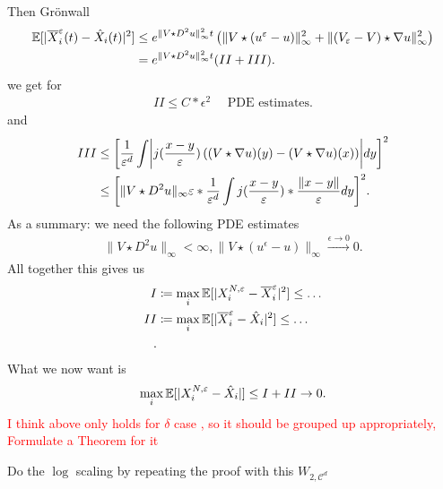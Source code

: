 Then Grönwall 
\begin{align*}
  \mathbb{E}[\lvert\overline{X}_i^{\varepsilon}(t) - \hat{X}_i(t)    \rvert^2] &\le  e^{\|V \star  D^2u\|_{\infty}^2t} \left( \|V \star (u^{\varepsilon}-u )\|_{\infty}^2 + \|(V_{\varepsilon}-V) \star  \nabla u\|_{\infty}^2 \right) \\
                                                              &=e^{\|V \star  D^2u\|_{\infty}^2t} (II + III)
.\end{align*}
we get for 
\begin{align*}
  II \le  C*\epsilon ^{2}  \quad  \text{ PDE estimates}
.\end{align*}
and 
\begin{align*}
  III &\le\bigg[\frac{1}{\epsilon ^{d} }  \int \abs*{j(\frac{x-y}{\epsilon})\left((V\star \nabla u)(y) -  (V \star  \nabla u)(x)\right)} dy\bigg]^2\\
      &\le \bigg[ \|V \star  D^2u\|_{\infty} \epsilon * \frac{1}{\epsilon ^{d} } \int  j(\frac{x-y}{\epsilon})*\frac{\|x-y\|}{\epsilon} dy \bigg ]^2
.\end{align*}
As a summary:  we need  the following PDE estimates
\begin{align*}
  \| V \star  D^2u\|_{\infty} < \infty, \|V \star (u^{\epsilon}- u )\|_{\infty} \xrightarrow{\epsilon\to 0} 0
.\end{align*}
All together this gives us 
\begin{align*}
  I &\coloneqq \max_{i} \mathbb{E}[\lvert X_i^{N,\varepsilon} -\overline{X}_i^{\varepsilon}  \rvert^2] \le \ldots \\
  II &\coloneqq \max_{i} \mathbb{E}[\lvert\overline{X}_i^{\varepsilon}-\hat{X}_i   \rvert^2] \le \ldots \\
.\end{align*}
What we now want is 
\begin{align*}
  \max_i \mathbb{E}[\lvert X_i^{N,\varepsilon} -\hat{X}_i \rvert] \le  I +II \to 0
.\end{align*}
\textcolor{Red}{I think above only holds for $\delta $ case , so it should be grouped up appropriately, Formulate a Theorem for it}
\begin{exercise}
 Do the $\log$ scaling by repeating  the proof with this $ W_{2,\mathcal{C}^{d} }$
\end{exercise}
